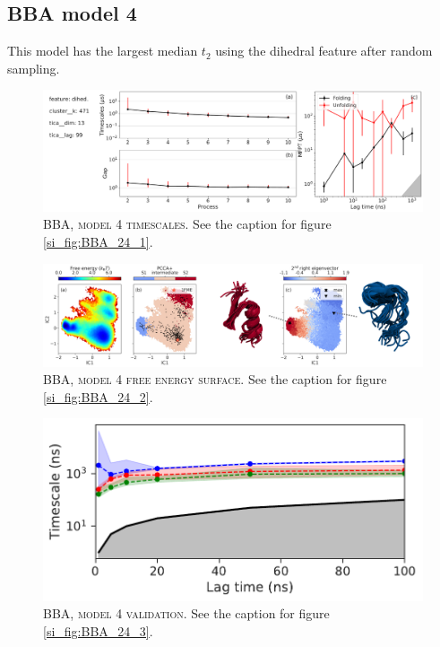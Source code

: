 \documentclass{article}
\begin{document}
\FloatBarrier
\clearpage


\subsection{BBA model 4}

This model has the largest median $t_{2}$ using the dihedral feature after random sampling.

\begin{figure}[h]
    \centering
    \includegraphics[width=\columnwidth]{SI_figures/BBA_6_SI-1.pdf}
    \caption{\textsc{BBA,  model 4 timescales}. See the caption for figure \ref{si_fig:BBA_24_1}.}
    \label{si_fig:BBA_6_1}
\end{figure}

\begin{figure}[h]
    \centering
    \includegraphics[width=\columnwidth]{SI_figures/BBA_6_SI-2.png}
    \caption{\textsc{BBA,  model 4 free energy surface}. See the caption for figure \ref{si_fig:BBA_24_2}.}
    \label{si_fig:BBA_6_2}
\end{figure}

\begin{figure}[h]
    \centering
    \includegraphics[height=0.15\textheight]{SI_figures/BBA_6_its.pdf}
    \caption{\textsc{BBA, model 4 validation}.  See the caption for figure \ref{si_fig:BBA_24_3}.}
    \label{si_fig:BBA_6_3}
\end{figure}
\end{document}
